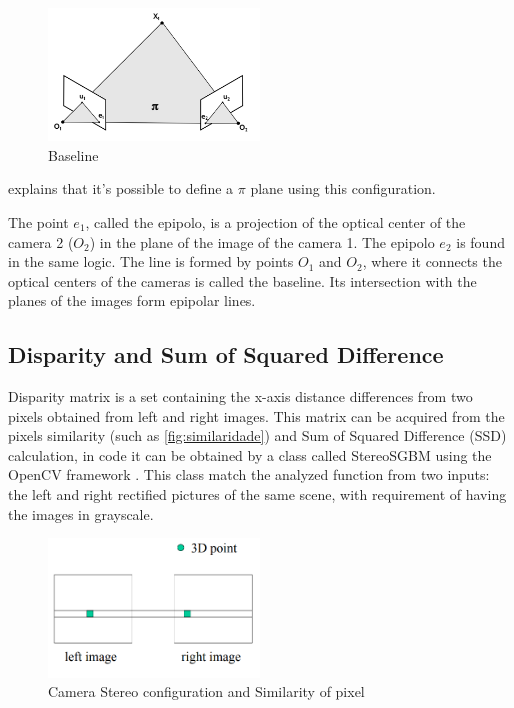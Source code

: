     \begin{figure}[H]
     \caption{\label{fig:epipolar03}
Baseline}
     \begin{center}
        \includegraphics[width=0.5\textwidth]{images/epipolar3.png}
     \end{center}
    \end{figure}
    
    \cite{geometriaEpipolarLeonardo} explains that it's possible to define a \(\pi\) plane using this configuration.
    
    The point \(e_{1}\), called the epipolo, is a projection of the optical center of the camera 2 (\(O_{2}\)) in the plane of the image of the camera 1. The epipolo \(e_{2}\) is found in the same logic. The line is formed by points \(O_{1}\) and \(O_{2}\), where it connects the optical centers of the cameras is called the baseline. Its intersection with the planes of the images form epipolar lines. 
    
\subsection{Disparity and Sum of Squared Difference}

    Disparity matrix is a set containing the x-axis distance differences from two pixels obtained from left and right images. This matrix can be acquired from the pixels similarity (such as \autoref{fig:similaridade}) and Sum of Squared Difference (SSD) calculation, in code it can be obtained by a class called StereoSGBM using the OpenCV framework \cite{openCVCalibration}. This class match the analyzed function from two inputs: the left and right rectified pictures of the same scene, with requirement of having the images in grayscale.
    
    \begin{figure}[H]
     \caption{\label{fig:similaridade}
Camera Stereo configuration and Similarity of pixel}
     \begin{center}
        \includegraphics[width=0.5\textwidth]{images/similaridade.png}
     \end{center}
    \end{figure}
    

